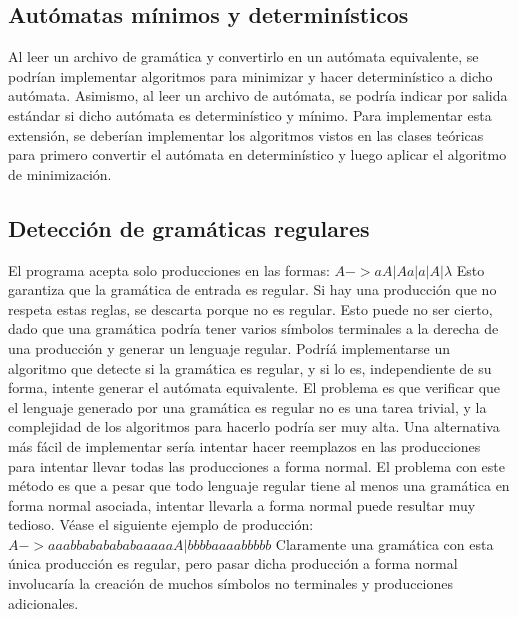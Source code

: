\documentclass[a4paper,10pt]{article}
\begin{document}
\subsection{ Autómatas mínimos y determinísticos }
Al leer un archivo de gramática y convertirlo en un autómata equivalente, se podrían implementar algoritmos para minimizar y hacer
determinístico a dicho autómata. Asimismo, al leer un archivo de autómata, se podría indicar por salida estándar si dicho autómata es 
determinístico y mínimo. Para implementar esta extensión, se deberían implementar los algoritmos vistos en las clases teóricas para 
primero convertir el autómata en determinístico y luego aplicar el algoritmo de minimización.
\subsection{Detección de gramáticas regulares}
El programa acepta solo producciones en las formas:
$A->aA | Aa | a | A | \lambda$
Esto garantiza que la gramática de entrada es regular. Si hay una producción que no respeta estas reglas, se descarta porque no es regular. Esto 
puede no ser cierto, dado que una gramática podría tener varios símbolos terminales a la derecha de una producción y generar un lenguaje regular. 
Podríá implementarse un algoritmo que detecte si la gramática es regular, y si lo es, independiente de su forma, intente generar el autómata 
equivalente. El problema es que verificar que el lenguaje generado por una gramática es regular no es una tarea  trivial, y la complejidad de los algoritmos 
para hacerlo podría ser muy alta. Una alternativa más fácil de implementar sería intentar hacer reemplazos en las producciones para intentar llevar todas 
las producciones a forma normal. El problema con este método es que a pesar que todo lenguaje regular tiene al menos una gramática en forma normal 
asociada, intentar llevarla a forma normal puede resultar muy tedioso. Véase el siguiente ejemplo de producción:
$ A->aaabbababababaaaaaA | bbbbaaaabbbbb $
Claramente una gramática con esta única producción es regular, pero pasar dicha producción a forma normal involucaría la creación de muchos símbolos 
no terminales y producciones adicionales.
\end{document}
